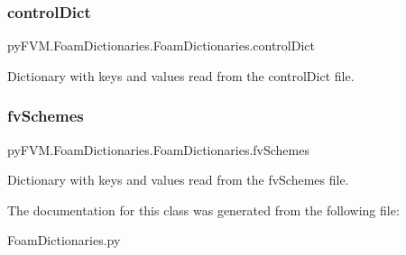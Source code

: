 \subsubsection{\texorpdfstring{controlDict}{controlDict}}
{\footnotesize\ttfamily py\+F\+V\+M.\+Foam\+Dictionaries.\+Foam\+Dictionaries.\+control\+Dict}



Dictionary with keys and values read from the \textquotesingle{}control\+Dict\textquotesingle{} file. 

\mbox{\label{classpy_f_v_m_1_1_foam_dictionaries_1_1_foam_dictionaries_acc8665199addb6c6c34bab84b759ad9d}} 
\subsubsection{\texorpdfstring{fvSchemes}{fvSchemes}}
{\footnotesize\ttfamily py\+F\+V\+M.\+Foam\+Dictionaries.\+Foam\+Dictionaries.\+fv\+Schemes}



Dictionary with keys and values read from the \textquotesingle{}fv\+Schemes\textquotesingle{} file. 



The documentation for this class was generated from the following file\+:\begin{DoxyCompactItemize}
\item 
Foam\+Dictionaries.\+py\end{DoxyCompactItemize}
